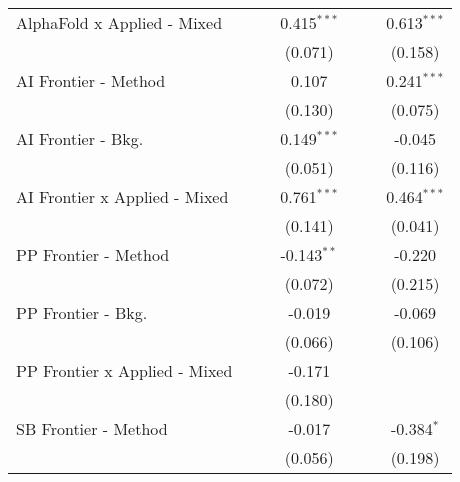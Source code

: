 \begin{tabular}{lcccccc}
   AlphaFold x Applied - Mixed   &               &               & 0.415$^{***}$  &               &               & 0.613$^{***}$\\   
                                 &               &               & (0.071)        &               &               & (0.158)\\   
   AI Frontier - Method          &               &               & 0.107          &               &               & 0.241$^{***}$\\   
                                 &               &               & (0.130)        &               &               & (0.075)\\   
   AI Frontier - Bkg.            &               &               & 0.149$^{***}$  &               &               & -0.045\\   
                                 &               &               & (0.051)        &               &               & (0.116)\\   
   AI Frontier x Applied - Mixed &               &               & 0.761$^{***}$  &               &               & 0.464$^{***}$\\   
                                 &               &               & (0.141)        &               &               & (0.041)\\   
   PP Frontier - Method          &               &               & -0.143$^{**}$  &               &               & -0.220\\   
                                 &               &               & (0.072)        &               &               & (0.215)\\   
   PP Frontier - Bkg.            &               &               & -0.019         &               &               & -0.069\\   
                                 &               &               & (0.066)        &               &               & (0.106)\\   
   PP Frontier x Applied - Mixed &               &               & -0.171         &               &               &   \\   
                                 &               &               & (0.180)        &               &               &   \\   
   SB Frontier - Method          &               &               & -0.017         &               &               & -0.384$^{*}$\\   
                                 &               &               & (0.056)        &               &               & (0.198)\\   

\end{tabular}
